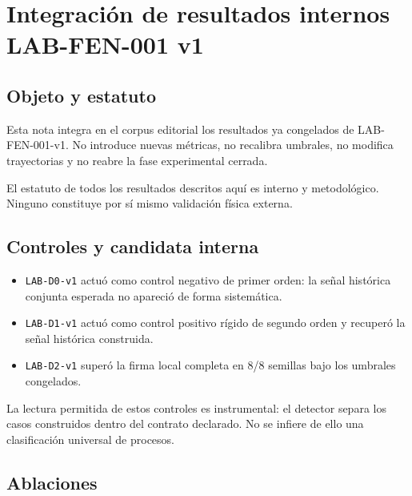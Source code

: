 \chapter*{Integración de resultados internos LAB-FEN-001 v1}

\section*{Objeto y estatuto}

\begin{observation}
Esta nota integra en el corpus editorial los resultados ya congelados de LAB-FEN-001-v1. No introduce nuevas métricas, no recalibra umbrales, no modifica trayectorias y no reabre la fase experimental cerrada.
\end{observation}

\begin{observation}
El estatuto de todos los resultados descritos aquí es interno y metodológico. Ninguno constituye por sí mismo validación física externa.
\end{observation}

\section*{Controles y candidata interna}

\begin{itemize}
\item \texttt{LAB-D0-v1} actuó como control negativo de primer orden: la señal histórica conjunta esperada no apareció de forma sistemática.
\item \texttt{LAB-D1-v1} actuó como control positivo rígido de segundo orden y recuperó la señal histórica construida.
\item \texttt{LAB-D2-v1} superó la firma local completa en 8/8 semillas bajo los umbrales congelados.
\end{itemize}

\begin{observation}
La lectura permitida de estos controles es instrumental: el detector separa los casos construidos dentro del contrato declarado. No se infiere de ello una clasificación universal de procesos.
\end{observation}

\section*{Ablaciones}

